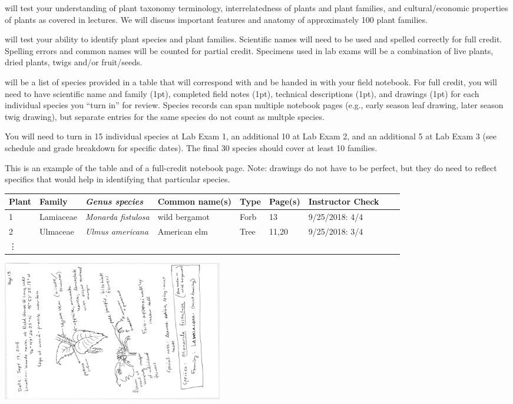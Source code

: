 \documentclass{tufte-handout}
\begin{document}
\begin{fullwidth}

 will test your understanding of plant taxonomy terminology, interrelatedness of plants and plant families, and cultural/economic properties of plants as covered in lectures. We will discuss important features and anatomy of approximately 100 plant families. 

 will test your ability to identify plant species and plant families. Scientific names will need to be used and spelled correctly for full credit. Spelling errors and common names will be counted for partial credit. Specimens used in lab exams will be a combination of live plants, dried plants, twigs and/or fruit/seeds.

 will be a list of species provided in a table that will correspond with and be handed in with your field notebook.  For full credit, you will need to have scientific name and family (1pt), completed field notes (1pt), technical descriptions (1pt), and drawings (1pt) for each individual species you ``turn in'' for review. Species records can span multiple notebook pages (e.g., early season leaf drawing, later season twig drawing), but separate entries for the same species do not count as multple species. 

You will need to turn in 15 individual species at Lab Exam 1, an additional 10 at Lab Exam 2, and an additional 5 at Lab Exam 3 (see schedule and grade breakdown for specific dates). The final 30 species should cover at least 10 families.

This is an example of the table and of a full-credit notebook page. Note: drawings do not have to be perfect, but they do need to reflect specifics that would help in identifying that particular species. 

\begin{tabular}{lllllllll}
\hline
Plant & Family & \emph{Genus species} & Common name(s) & Type & Page(s) & Instructor Check & \\
\hline
1 & Lamiaceae & \emph{Monarda fistulosa} & wild bergamot & Forb & 13 & 9/25/2018: 4/4 \\
2 & Ulmaceae & \emph{Ulmus americana} & American elm & Tree & 11,20 & 9/25/2018: 3/4 \\
\vdots \\
\hline
\end{tabular}

\includegraphics[width=3.8in,angle=90]{example_notebook.jpg}


\end{fullwidth}
\end{document}

